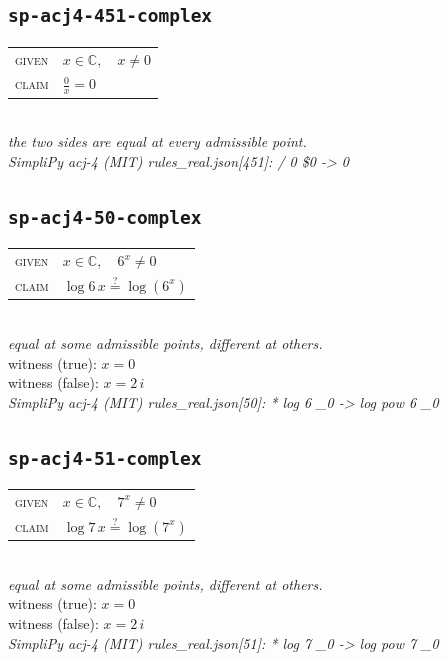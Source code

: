 \documentclass[11pt]{article}
\begin{document}
\subsection*{\texttt{sp-acj4-451-complex}}
\begin{tabular}{@{}l@{\quad}l@{}}
\textsc{given} & $x \in \mathbb{C},\quad x \neq 0$ \\[4pt]
\textsc{claim} & $\displaystyle \frac{0}{x} = 0$ \\
\end{tabular}\\[2pt]
{\small\emph{the two sides are equal at every admissible point.}}\\
\emph{SimpliPy acj-4 (MIT) rules\_real.json[451]: / 0 \$0  ->  0}\\

\subsection*{\texttt{sp-acj4-50-complex}}
\begin{tabular}{@{}l@{\quad}l@{}}
\textsc{given} & $x \in \mathbb{C},\quad 6^{x} \neq 0$ \\[4pt]
\textsc{claim} & $\displaystyle \log 6 \, x \overset{?}{=} \log\left(6^{x}\right)$ \\
\end{tabular}\\[2pt]
{\small\emph{equal at some admissible points, different at others.}}\\
{\footnotesize\color{gray}witness (true): $x = 0$}\\
{\footnotesize\color{gray}witness (false): $x = 2 \, i$}\\
\emph{SimpliPy acj-4 (MIT) rules\_real.json[50]: * log 6 \_0  ->  log pow 6 \_0}\\

\subsection*{\texttt{sp-acj4-51-complex}}
\begin{tabular}{@{}l@{\quad}l@{}}
\textsc{given} & $x \in \mathbb{C},\quad 7^{x} \neq 0$ \\[4pt]
\textsc{claim} & $\displaystyle \log 7 \, x \overset{?}{=} \log\left(7^{x}\right)$ \\
\end{tabular}\\[2pt]
{\small\emph{equal at some admissible points, different at others.}}\\
{\footnotesize\color{gray}witness (true): $x = 0$}\\
{\footnotesize\color{gray}witness (false): $x = 2 \, i$}\\
\emph{SimpliPy acj-4 (MIT) rules\_real.json[51]: * log 7 \_0  ->  log pow 7 \_0}\\
\end{document}
